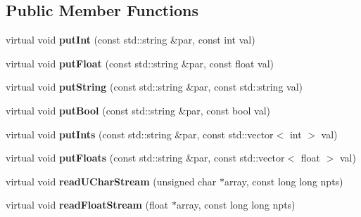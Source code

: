 \subsection*{Public Member Functions}
\begin{DoxyCompactItemize}
\item 
\mbox{\label{class_s_e_p_1_1generic_reg_file_a6ba2865debd9aedc4911589fb4d4d4cb}} 
virtual void {\bfseries put\+Int} (const std\+::string \&par, const int val)
\item 
\mbox{\label{class_s_e_p_1_1generic_reg_file_a10890f87ed85887c17c4a3f72e58190b}} 
virtual void {\bfseries put\+Float} (const std\+::string \&par, const float val)
\item 
\mbox{\label{class_s_e_p_1_1generic_reg_file_a7baf06b24372cdf99f143fd806ed2291}} 
virtual void {\bfseries put\+String} (const std\+::string \&par, const std\+::string val)
\item 
\mbox{\label{class_s_e_p_1_1generic_reg_file_a2373fda2832032a50b8146c696f46fe5}} 
virtual void {\bfseries put\+Bool} (const std\+::string \&par, const bool val)
\item 
\mbox{\label{class_s_e_p_1_1generic_reg_file_afde1a602394aaf50143705c79b4e62f6}} 
virtual void {\bfseries put\+Ints} (const std\+::string \&par, const std\+::vector$<$ int $>$ val)
\item 
\mbox{\label{class_s_e_p_1_1generic_reg_file_a23428e1122c1975e964221a6775ff694}} 
virtual void {\bfseries put\+Floats} (const std\+::string \&par, const std\+::vector$<$ float $>$ val)
\item 
\mbox{\label{class_s_e_p_1_1generic_reg_file_a8f9d0c2aa2ebe94e65d375953e85952d}} 
virtual void {\bfseries read\+U\+Char\+Stream} (unsigned char $\ast$array, const long long npts)
\item 
\mbox{\label{class_s_e_p_1_1generic_reg_file_a585c5be94c894dccfecdc3a63f94cfc5}} 
virtual void {\bfseries read\+Float\+Stream} (float $\ast$array, const long long npts)

\end{DoxyCompactItemize}
